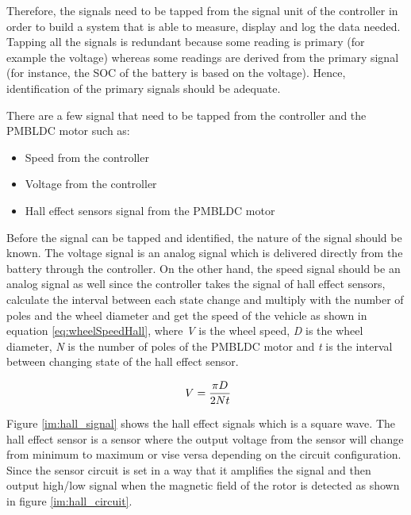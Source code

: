 Therefore, the signals need to be tapped from the signal unit of the controller in order to build a system that is able to measure, display and log the data needed. Tapping all the signals is redundant because some reading is primary (for example the voltage) whereas some readings are derived from the primary signal (for instance, the SOC of the battery is based on the voltage). Hence, identification of the primary signals should be adequate.

There are a few signal that need to be tapped from the controller and the PMBLDC motor such as:

\begin{itemize}
	\item{Speed from the controller}
	\item{Voltage from the controller}
	\item{Hall effect sensors signal from the PMBLDC motor}
\end{itemize}

Before the signal can be tapped and identified, the nature of the signal should be known. The voltage signal is an analog signal which is delivered directly from the battery through the controller. On the other hand, the speed signal should be an analog signal as well since the controller takes the signal of hall effect sensors, calculate the interval between each state change and multiply with the number of poles and the wheel diameter and get the speed of the vehicle as shown in equation \ref{eq:wheelSpeedHall}, where \textit{V} is the wheel speed, \textit{D} is the wheel diameter, \textit{N} is the number of poles of the PMBLDC motor and \textit{t} is the interval between changing state of the hall effect sensor.

\begin{equation}
	\label{eq:wheelSpeedHall}
	\text{\myequations{Wheel speed for direct drive based on hall effect sensor signal, wheel diameter and PMBLDC number of poles}}
	V = \frac{\pi D}{2Nt}
\end{equation}

Figure \ref{im:hall_signal} shows the hall effect signals which is a square wave. The hall effect sensor is a sensor where the output voltage from the sensor will change from minimum to maximum or vise versa depending on the circuit configuration. Since the sensor circuit is set in a way that it amplifies the signal and then output high/low signal when the magnetic field of the rotor is detected as shown in figure \ref{im:hall_circuit}.

